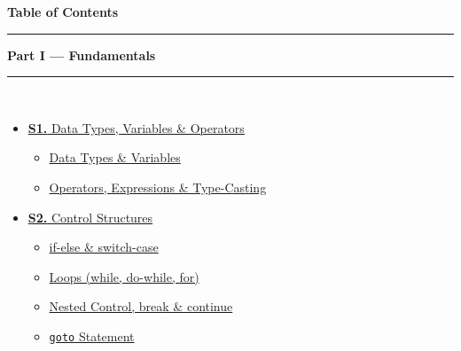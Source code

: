 \documentclass[12pt,a3paper]{article}
\begin{document}
\thispagestyle{fancy}
\begin{center}
  {\LARGE\bfseries\textcolor{pblue}{Table of Contents}}\\[6pt]
  \textcolor{pblue}{\rule{0.6\textwidth}{0.8pt}}
\end{center}
\vspace{6pt}

\begin{tcolorbox}[breakable,colback=cA!5,colframe=cA,boxrule=1pt,arc=5pt,
  left=8pt,right=8pt,top=8pt,bottom=8pt,before skip=4pt]
  {\large\bfseries\textcolor{cA}{Part I --- Fundamentals}}\\[5pt]
  \textcolor{cA!40}{\rule{\textwidth}{0.4pt}}\\[3pt]
  \small\begin{itemize}[leftmargin=1.2em,itemsep=1pt,label={\textcolor{cA}{$\triangleright$}}]
    \item \hyperref[sec:S1]{\textbf{S1.} Data Types, Variables \& Operators}
      \begin{itemize}[leftmargin=1.5em,itemsep=0pt,label={\textcolor{cA}{$\cdot$}}]
        \item \hyperref[sub:s1-datatypes]{Data Types \& Variables}
        \item \hyperref[sub:s1-operators]{Operators, Expressions \& Type-Casting}
      \end{itemize}
    \item \hyperref[sec:S2]{\textbf{S2.} Control Structures}
      \begin{itemize}[leftmargin=1.5em,itemsep=0pt,label={\textcolor{cA}{$\cdot$}}]
        \item \hyperref[sub:s2-ifelse]{if-else \& switch-case}
        \item \hyperref[sub:s2-loops]{Loops (while, do-while, for)}
        \item \hyperref[sub:s2-nested]{Nested Control, break \& continue}
        \item \hyperref[sub:s2-goto]{\texttt{goto} Statement}
      \end{itemize}
  \end{itemize}
\end{tcolorbox}
\end{document}
